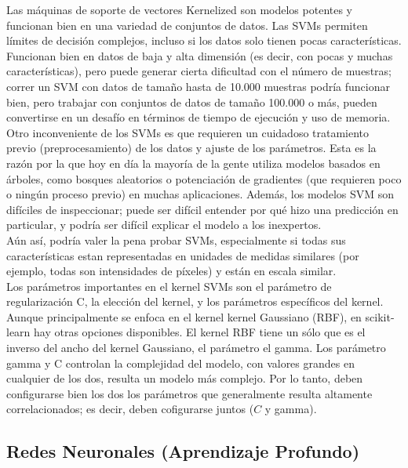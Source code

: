 {Las máquinas de soporte de vectores Kernelized son modelos potentes y funcionan bien en una variedad
 de conjuntos de datos. Las SVMs permiten límites de decisión complejos, incluso si los datos solo tienen pocas características. Funcionan bien en datos de baja y alta dimensión (es decir, con pocas y muchas características), pero puede generar cierta dificultad con el número de muestras; correr un SVM con datos de tamaño hasta de 10.000 muestras podría funcionar bien, pero trabajar con conjuntos de datos de tamaño 100.000 o más, pueden convertirse en un desafío en términos de tiempo de ejecución y uso de memoria.\\


Otro inconveniente de los SVMs es que requieren un cuidadoso tratamiento previo (preprocesamiento)  de los datos y ajuste de los parámetros. Esta es la razón por la que hoy en día la mayoría de la gente utiliza modelos basados en árboles, como bosques aleatorios o potenciación de gradientes (que requieren poco o ningún proceso previo) en muchas aplicaciones.   Además, los modelos SVM son difíciles de inspeccionar; puede ser difícil entender por qué  hizo una predicción en particular, y podría ser difícil explicar el modelo a los inexpertos.\\

Aún así, podría valer la pena probar SVMs, especialmente si todas sus características estan  representadas
en unidades de medidas similares (por ejemplo, todas son intensidades de píxeles) y están en 
escala  similar.\\

Los parámetros importantes en el  kernel SVMs  son el parámetro de regularización C, la
elección del kernel, y los parámetros específicos del kernel.  Aunque principalmente se enfoca en el  kernel  kernel Gaussiano (RBF), en {\ttfamily scikit-learn}  hay otras opciones disponibles.  El  kernel RBF  tiene un sólo   que es el inverso del ancho del  kernel Gaussiano, el  parámetro el gamma.   Los  parámetro gamma y C controlan la complejidad del modelo, con valores grandes en cualquier de los dos, resulta un modelo más complejo. Por lo tanto, deben configurarse bien los dos los parámetros que  generalmente resulta altamente correlacionados; es decir,  deben cofigurarse juntos ($C$ y gamma).


\subsection{Redes Neuronales (Aprendizaje Profundo)}

}
